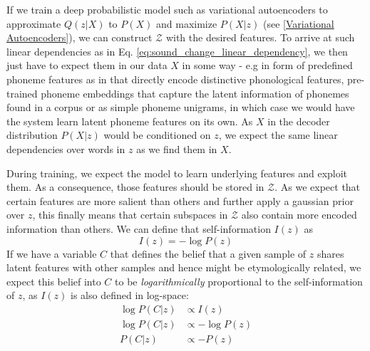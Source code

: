 \documentclass[6pt]{article}
\begin{document}
If we train a deep probabilistic model such as variational autoencoders to approximate $Q(z|X)$ to $P(X)$ and maximize $P(X|z)$ (see \ref{Variational Autoencoders}), we can construct $\mathcal{Z}$ with the desired features. To arrive at such linear dependencies as in Eq. \ref{eq:sound_change_linear_dependency}, we then just have to expect them in our data $X$ in some way - e.g in form of predefined phoneme features as in \cite{kondrak2000new,list2012sca,rama2016siamese} that directly encode distinctive phonological features, pre-trained phoneme embeddings that capture the latent information of phonemes found in a corpus or as simple phoneme unigrams, in which case we would have the system learn latent phoneme features on its own. As $X$ in the decoder distribution $P(X|z)$ would be conditioned on $z$, we expect the same linear dependencies over words in $z$ as we find them in $X$.







During training, we expect the model to learn underlying features and exploit them. As a consequence, those features should be stored in $\mathcal{Z}$. As we expect that certain features are more salient than others and further apply a gaussian prior over $z$, this finally means that certain subspaces in $\mathcal{Z}$ also contain more encoded information than others. We can define that self-information $I(z)$ as
\begin{equation}
I(z) = - \log P(z)
\end{equation}
If we have a variable $C$ that defines the belief that a given sample of $z$ shares latent features with other samples and hence might be etymologically related, we expect this belief into $C$ to be \textit{logarithmically} proportional to the self-information of $z$, as $I(z)$ is also defined in log-space:
\begin{equation}
\begin{split}
\log P(C|z) & \propto  I(z) \\
\log P(C|z) & \propto  - \log P(z) \\
P(C|z) & \propto  - P(z) 
\end{split}
\end{equation}
\end{document}
